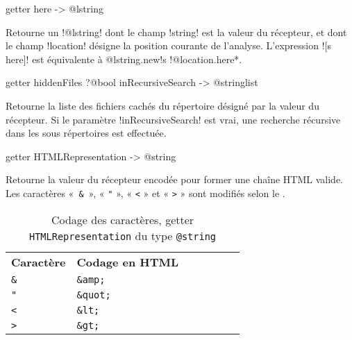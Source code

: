 
\begin{galgasbox}
getter here -> @lstring
\end{galgasbox}

Retourne un \ggs!@lstring! dont le champ \ggs!string! est la valeur du récepteur, et dont le champ \ggs!location! désigne la position courante de l'analyse. L'expression \ggs![s here]! est équivalente à \ggs*@lstring.new{!s !@location.here}*.









\begin{galgasbox}
getter hiddenFiles ?@bool inRecursiveSearch -> @stringlist
\end{galgasbox}

Retourne la liste des fichiers cachés du répertoire désigné par la valeur du récepteur. Si le paramètre \ggs!inRecursiveSearch! est vrai, une recherche récursive dans les sous répertoires est effectuée.











\begin{galgasbox}
getter HTMLRepresentation -> @string
\end{galgasbox}
Retourne la valeur du récepteur encodée pour former une chaîne HTML valide. Les caractères «~\texttt{\&}~», « \texttt{"} », « \texttt{<} » et « \texttt{>} » sont modifiés selon le .


\begin{table}[t]
  \centering
  \begin{tabular}{lllllll}
  \textbf{Caractère} & \textbf{Codage en HTML} \\
  \texttt{\&} & \texttt{\&amp;} \\
  \texttt{"} & \texttt{\&quot;} \\
  \texttt{<} & \texttt{\&lt;} \\
  \texttt{>} & \texttt{\&gt;} \\
  \end{tabular}
  \caption{Codage des caractères, getter \texttt{HTMLRepresentation} du type \texttt{@string}}
  \ligne
\end{table}






